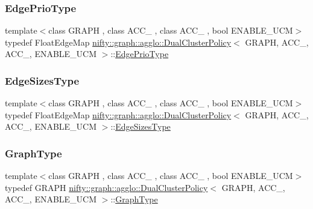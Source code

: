 \subsubsection{\texorpdfstring{Edge\+Prio\+Type}{EdgePrioType}}
{\footnotesize\ttfamily template$<$class G\+R\+A\+PH , class A\+C\+C\+\_ , class A\+C\+C\+\_ , bool E\+N\+A\+B\+L\+E\+\_\+\+U\+CM$>$ \\
typedef Float\+Edge\+Map \hyperlink{classnifty_1_1graph_1_1agglo_1_1DualClusterPolicy}{nifty\+::graph\+::agglo\+::\+Dual\+Cluster\+Policy}$<$ G\+R\+A\+PH, A\+C\+C\+\_, A\+C\+C\+\_, E\+N\+A\+B\+L\+E\+\_\+\+U\+CM $>$\+::\hyperlink{classnifty_1_1graph_1_1agglo_1_1DualClusterPolicy_a54d7666f80620939d704938530b7564a}{Edge\+Prio\+Type}}

\mbox{\label{classnifty_1_1graph_1_1agglo_1_1DualClusterPolicy_a7687a1027ad05abe1b32b034cc383003}} 
\subsubsection{\texorpdfstring{Edge\+Sizes\+Type}{EdgeSizesType}}
{\footnotesize\ttfamily template$<$class G\+R\+A\+PH , class A\+C\+C\+\_ , class A\+C\+C\+\_ , bool E\+N\+A\+B\+L\+E\+\_\+\+U\+CM$>$ \\
typedef Float\+Edge\+Map \hyperlink{classnifty_1_1graph_1_1agglo_1_1DualClusterPolicy}{nifty\+::graph\+::agglo\+::\+Dual\+Cluster\+Policy}$<$ G\+R\+A\+PH, A\+C\+C\+\_, A\+C\+C\+\_, E\+N\+A\+B\+L\+E\+\_\+\+U\+CM $>$\+::\hyperlink{classnifty_1_1graph_1_1agglo_1_1DualClusterPolicy_a7687a1027ad05abe1b32b034cc383003}{Edge\+Sizes\+Type}}

\mbox{\label{classnifty_1_1graph_1_1agglo_1_1DualClusterPolicy_ad8e19fe87ad08f4187fdb79c1367389a}} 
\subsubsection{\texorpdfstring{Graph\+Type}{GraphType}}
{\footnotesize\ttfamily template$<$class G\+R\+A\+PH , class A\+C\+C\+\_ , class A\+C\+C\+\_ , bool E\+N\+A\+B\+L\+E\+\_\+\+U\+CM$>$ \\
typedef G\+R\+A\+PH \hyperlink{classnifty_1_1graph_1_1agglo_1_1DualClusterPolicy}{nifty\+::graph\+::agglo\+::\+Dual\+Cluster\+Policy}$<$ G\+R\+A\+PH, A\+C\+C\+\_, A\+C\+C\+\_, E\+N\+A\+B\+L\+E\+\_\+\+U\+CM $>$\+::\hyperlink{classnifty_1_1graph_1_1agglo_1_1DualClusterPolicy_ad8e19fe87ad08f4187fdb79c1367389a}{Graph\+Type}}

